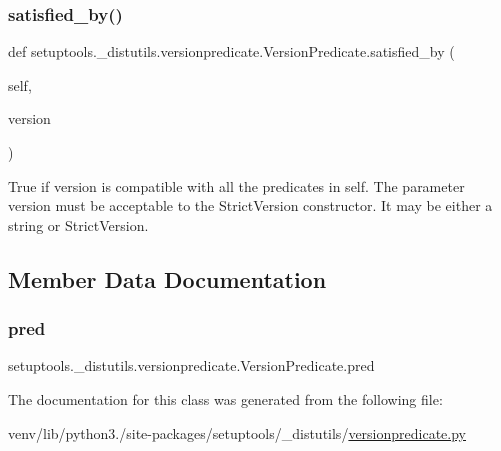 \subsubsection{\texorpdfstring{satisfied\+\_\+by()}{satisfied\_by()}}
{\footnotesize\ttfamily def setuptools.\+\_\+distutils.\+versionpredicate.\+Version\+Predicate.\+satisfied\+\_\+by (\begin{DoxyParamCaption}\item[{}]{self,  }\item[{}]{version }\end{DoxyParamCaption})}

\begin{DoxyVerb}True if version is compatible with all the predicates in self.
The parameter version must be acceptable to the StrictVersion
constructor.  It may be either a string or StrictVersion.
\end{DoxyVerb}
 

\subsection{Member Data Documentation}
\mbox{\label{classsetuptools_1_1__distutils_1_1versionpredicate_1_1VersionPredicate_a2ad2261c1f41e2ca1bcc9ea5a22f2ff7}} 
\subsubsection{\texorpdfstring{pred}{pred}}
{\footnotesize\ttfamily setuptools.\+\_\+distutils.\+versionpredicate.\+Version\+Predicate.\+pred}



The documentation for this class was generated from the following file\+:\begin{DoxyCompactItemize}
\item 
venv/lib/python3./site-\/packages/setuptools/\+\_\+distutils/\hyperlink{versionpredicate_8py}{versionpredicate.\+py}\end{DoxyCompactItemize}
